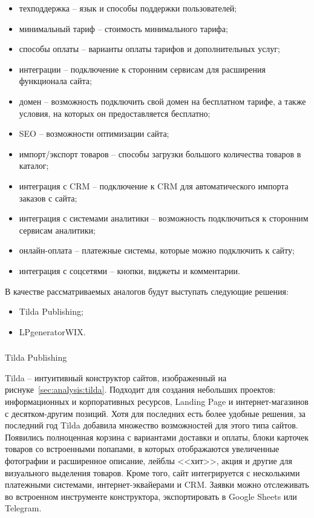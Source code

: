 \begin{itemize}
  \item техподдержка -- язык и способы поддержки пользователей;
  \item минимальный тариф -- стоимость минимального тарифа;
  \item способы оплаты -- варианты оплаты тарифов и дополнительных услуг;
  \item интеграции -- подключение к сторонним сервисам для расширения функционала сайта;
  \item домен -- возможность подключить свой домен на бесплатном тарифе, а также условия, на которых он предоставляется бесплатно;
  \item SEO -- возможности оптимизации сайта;
  \item импорт/экспорт товаров -- способы загрузки большого количества товаров в каталог;
  \item интеграция с CRM -- подключение к CRM для автоматического импорта заказов с сайта;
  \item интеграция с системами аналитики -- возможность подключиться к сторонним сервисам аналитики;
  \item онлайн-оплата -- платежные системы, которые можно подключить к сайту;
  \item интеграция с соцсетями -- кнопки, виджеты и комментарии.
\end{itemize}

В качестве рассматриваемых аналогов будут выступать следующие решения:
\begin{itemize}
  \item Tilda Publishing;
  \item LPgeneratorWIX.
\end{itemize}

\subsubsection{}Tilda Publishing
\

Tilda -- интуитивный конструктор сайтов, изображенный на риснуке~\ref{sec:analysis:tilda}. Подходит для создания небольших проектов: информационных и корпоративных ресурсов, Landing Page и интернет-магазинов с десятком-другим позиций. Хотя для последних есть более удобные решения, за последний год Tilda добавила множество возможностей для этого типа сайтов. Появились полноценная корзина с вариантами доставки и оплаты, блоки карточек товаров со встроенными попапами, в которых отображаются увеличенные фотографии и расширенное описание, лейблы <<хит>>, акция и другие для визуального выделения товаров. Кроме того, сайт интегрируется с несколькими платежными системами, интернет-эквайерами и CRM. Заявки можно отслеживать во встроенном инструменте конструктора, экспортировать в Google Sheets или Telegram.


